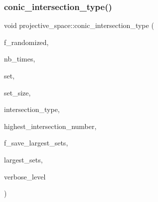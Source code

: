 \mbox{\label{classprojective__space_a8f3472a2e9af4ac7874a5195ec6e0d58}} 
\subsubsection{\texorpdfstring{conic\+\_\+intersection\+\_\+type()}{conic\_intersection\_type()}}
{\footnotesize\ttfamily void projective\+\_\+space\+::conic\+\_\+intersection\+\_\+type (\begin{DoxyParamCaption}\item[{\mbox{\hyperlink{galois_8h_a09fddde158a3a20bd2dcadb609de11dc}{I\+NT}}}]{f\+\_\+randomized,  }\item[{\mbox{\hyperlink{galois_8h_a09fddde158a3a20bd2dcadb609de11dc}{I\+NT}}}]{nb\+\_\+times,  }\item[{\mbox{\hyperlink{galois_8h_a09fddde158a3a20bd2dcadb609de11dc}{I\+NT}} $\ast$}]{set,  }\item[{\mbox{\hyperlink{galois_8h_a09fddde158a3a20bd2dcadb609de11dc}{I\+NT}}}]{set\+\_\+size,  }\item[{\mbox{\hyperlink{galois_8h_a09fddde158a3a20bd2dcadb609de11dc}{I\+NT}} $\ast$\&}]{intersection\+\_\+type,  }\item[{\mbox{\hyperlink{galois_8h_a09fddde158a3a20bd2dcadb609de11dc}{I\+NT}} \&}]{highest\+\_\+intersection\+\_\+number,  }\item[{\mbox{\hyperlink{galois_8h_a09fddde158a3a20bd2dcadb609de11dc}{I\+NT}}}]{f\+\_\+save\+\_\+largest\+\_\+sets,  }\item[{\mbox{\hyperlink{classset__of__sets}{set\+\_\+of\+\_\+sets}} $\ast$\&}]{largest\+\_\+sets,  }\item[{\mbox{\hyperlink{galois_8h_a09fddde158a3a20bd2dcadb609de11dc}{I\+NT}}}]{verbose\+\_\+level }\end{DoxyParamCaption})}

\mbox{\label{classprojective__space_ac89e189c57d38120fd83fec078fd59e8}} 
